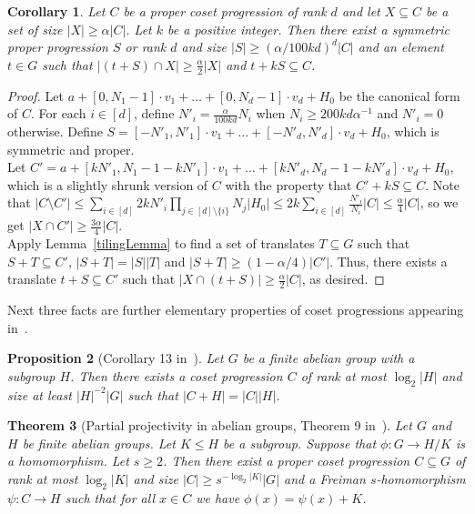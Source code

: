 \documentclass[a4paper,11pt]{article}
\newtheorem{theorem}{Theorem}
\numberwithin{theorem}{section}
\newtheorem{corollary}[theorem]{Corollary}
\newtheorem{proposition}[theorem]{Proposition}
\theoremstyle{definition}
\begin{document}
\begin{corollary}\label{shrunksymmcpCor}
    Let $C$ be a proper coset progression of rank $d$ and let $X \subseteq C$ be a set of size $|X| \geq \alpha |C|$. Let $k$ be a positive integer. Then there exist a symmetric proper progression $S$ or rank $d$ and size $|S| \geq (\alpha/100 kd)^d |C|$ and an element $t \in G$ such that $|(t + S) \cap X| \geq \frac{\alpha}{2} |X|$ and $t + k S \subseteq C$.
\end{corollary}

\begin{proof}
    Let $a + [0, N_1 -1 ] \cdot v_1 + \dots + [0, N_d - 1] \cdot v_d + H_0$ be the canonical form of $C$. For each $i \in [d]$, define $N'_i = \frac{\alpha}{100 kd} N_i$ when $N_i \geq 200 kd \alpha^{-1}$ and $N'_i = 0$ otherwise. Define $S = [-N'_1, N'_1] \cdot v_1 + \dots + [-N'_d, N'_d] \cdot v_d + H_0$, which is symmetric and proper.\\   
    \indent Let $C' = a + [kN'_1, N_1 - 1 - kN'_1] \cdot v_1 + \dots + [kN'_d, N_d - 1 - kN'_d] \cdot v_d + H_0$, which is a slightly shrunk version of $C$ with the property that $C' + k S \subseteq C$. Note that $|C \setminus C'| \leq \sum_{i \in [d]} 2kN'_i \prod_{j \in [d] \setminus \{i\}} N_j |H_0| \leq 2k \sum_{i \in [d]} \frac{N'_i}{N_i} |C| \leq \frac{\alpha}{4} |C|$, so we get $|X \cap C'| \geq \frac{3\alpha}{4} |C|$.\\
    Apply Lemma~\ref{tilingLemma} to find a set of translates $T \subseteq G$ such that $S + T \subseteq C'$, $|S+ T| = | S||T|$ and $|S + T| \geq (1 - \alpha/4) |C'|$. Thus, there exists a translate $t + S \subseteq C'$ such that $|X \cap (t + S)| \geq \frac{\alpha}{2} |C|$, as desired.
\end{proof}

Next three facts are further elementary properties of coset progressions appearing in~\cite{generalBilBog}.

\begin{proposition}[Corollary 13 in~\cite{generalBilBog}]Let $G$ be a finite abelian group with a subgroup $H$. Then there exists a coset progression $C$ of rank at most $\log_2 |H|$ and size at least $|H|^{-2}|G|$ such that $|C + H| = |C| |H|$.\end{proposition}

\begin{theorem}[Partial projectivity in abelian groups, Theorem 9 in~\cite{generalBilBog}]\label{partialProjThm}Let $G$ and $H$ be finite abelian groups. Let $K \leq H$ be a subgroup. Suppose that $\phi \colon G \to H/K$ is a homomorphism. Let $s \geq 2$. Then there exist a proper coset progression $C \subseteq G$ of rank at most $\log_2 |K|$ and size $|C| \geq s^{- \log_2 |K|}|G|$ and a Freiman $s$-homomorphism $\psi \colon C \to H$ such that for all $x \in C$ we have $\phi(x) = \psi(x) + K$.\end{theorem}
\end{document}
